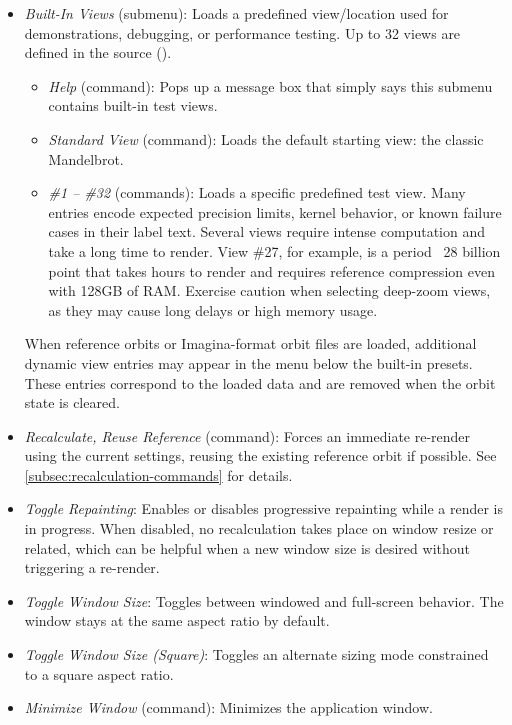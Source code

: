 \begin{itemize}
  \item \emph{Built-In Views} (submenu): Loads a predefined view/location used
  for demonstrations, debugging, or performance testing.  Up to 32 views are
  defined in the source ().
    \begin{itemize}
      \item \emph{Help} (command): Pops up a message box that simply says this
      submenu contains built-in test views.
      \item \emph{Standard View} (command): Loads the default starting view: the
      classic Mandelbrot.
      \item \emph{\#1 -- \#32} (commands): Loads a specific predefined
      test view. Many entries encode expected precision limits, kernel behavior,
      or known failure cases in their label text.  Several views require intense
      computation and take a long time to render.  View \#27, for example, is a
      period ~28 billion point that takes hours to render and requires reference
      compression even with 128GB of RAM.  Exercise caution when selecting deep-zoom
      views, as they may cause long delays or high memory usage.

    \end{itemize}
    When reference orbits or Imagina-format orbit files are loaded, additional
    dynamic view entries may appear in the menu below the built-in presets.
    These entries correspond to the loaded data and are removed when the orbit
    state is cleared.

  \item \emph{Recalculate, Reuse Reference} (command): Forces an immediate
  re-render using the current settings, reusing the existing reference orbit if
  possible.  See \cref{subsec:recalculation-commands} for details.

  \item \emph{Toggle Repainting}: Enables or disables progressive
  repainting while a render is in progress. When disabled, no recalculation
  takes place on window resize or related, which can be helpful when a new
  window size is desired without triggering a re-render.
  \item \emph{Toggle Window Size}: Toggles between windowed and
  full-screen behavior.  The window stays at the same aspect ratio by default.
  \item \emph{Toggle Window Size (Square)}: Toggles an alternate sizing
  mode constrained to a square aspect ratio.
  \item \emph{Minimize Window} (command): Minimizes the application window.


\end{itemize}

